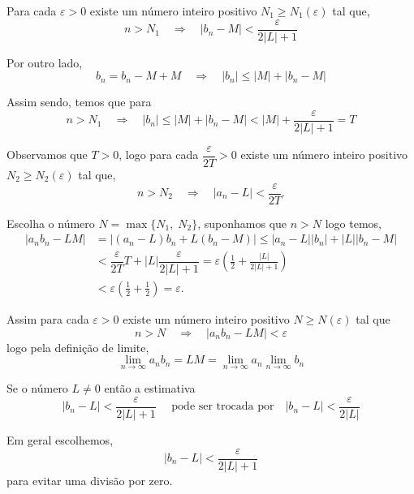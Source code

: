 Para cada $\varepsilon>0$ existe um n\'{u}mero inteiro positivo $N_1\geq N_1(\varepsilon)$ tal que,
\begin{equation*}
    n>N_1\quad \Rightarrow \quad |b_n-M|<\dfrac{\varepsilon}{2|L|+1}
\end{equation*}

Por outro lado,
\begin{equation*}
    b_n=b_n-M+M\quad \Rightarrow \quad |b_n|\leq |M|+|b_n-M|
\end{equation*}

Assim sendo, temos que para
\begin{equation*}
    n>N_1\quad \Rightarrow \quad |b_n|\leq |M|+|b_n-M|< |M|+\dfrac{\varepsilon}{2|L|+1}=T
\end{equation*}

Observamos que $T>0$, logo para cada $\dfrac{\varepsilon}{2T}>0$ existe um n\'{u}mero inteiro positivo $N_2\geq N_2(\varepsilon)$ tal que,
\begin{equation*}
    n>N_2 \quad \Rightarrow \quad |a_n-L|<\dfrac{\varepsilon}{2T}.
\end{equation*}

Escolha o n\'{u}mero $N=\max\{N_1, \; N_2\}$, suponhamos que $n>N$ logo temos,
\begin{align*}
    |a_nb_n-LM|&=|(a_n-L)b_n+L(b_n-M)|\leq |a_n-L||b_n|+|L||b_n-M|\\[2ex]
               &<\dfrac{\varepsilon}{2T}T+|L|\dfrac{\varepsilon}{2|L|+1}
  =\varepsilon\left(\frac{1}{2}+\frac{|L|}{2|L|+1}\right)\\[2ex]
&<\varepsilon\left(\frac{1}{2}+\frac{1}{2}\right)=\varepsilon.
\end{align*}

Assim para cada $\varepsilon>0$ existe um n\'{u}mero inteiro positivo $N\geq N(\varepsilon)$ tal que
\begin{equation*}
    n>N \quad \Rightarrow\quad |a_nb_n-LM|<\varepsilon
\end{equation*}
logo pela defini\c{c}\~{a}o de limite,
\begin{equation*}
    \lim_{n\to\infty}a_nb_n=LM=\lim_{n\to\infty}a_n\lim_{n\to\infty}b_n
\end{equation*}

\begin{note}
Se o n\'{u}mero $L\neq 0$ ent\~{a}o a estimativa
\begin{equation*}
    |b_n-L|<\dfrac{\varepsilon}{2|L|+1}\quad\text{ pode ser trocada por}\quad |b_n-L|<\dfrac{\varepsilon}{2|L|}
\end{equation*}

Em geral  escolhemos,
\begin{equation*}
    |b_n-L|<\dfrac{\varepsilon}{2|L|+1}
\end{equation*}
para evitar uma divis\~{a}o por zero.
\end{note}

